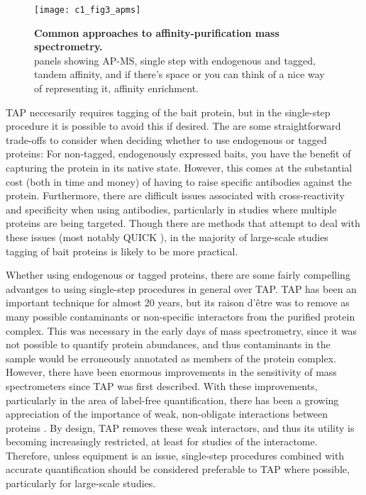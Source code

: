 \documentclass[a4paper,11pt,twoside,openright]{scrbook}
\begin{document}
\begin{figure}[h]
    \texttt{[image: c1\_fig3\_apms]}
    \caption[Common approaches to affinity-purification mass spectrometry]{\sffamily \textbf{Common approaches to affinity-purification mass spectrometry.} \\  panels showing AP-MS, single step with endogenous and tagged, tandem affinity, and if there's space or you can think of a nice way of representing it, affinity enrichment.}
    \label{c1fig3}
\end{figure}

TAP neccesarily requires tagging of the bait protein, but in the single-step procedure it is possible to avoid this if desired. The are some straightforward trade-offs to consider when deciding whether to use endogenous or tagged proteins: For non-tagged, endogenously expressed baits, you have the benefit of capturing the protein in its native state. However, this comes at the substantial cost (both in time and money) of having to raise specific antibodies against the protein. Furthermore, there are difficult issues associated with cross-reactivity and specificity when using antibodies, particularly in studies where multiple proteins are being targeted. Though there are methods that attempt to deal with these issues (most notably QUICK \cite{Selbach2006}), in the majority of large-scale studies tagging of bait proteins is likely to be more practical.

Whether using endogenous or tagged proteins, there are some fairly compelling advantges to using single-step procedures in general over TAP. TAP has been an important technique for almost 20 years, but its raison d'être was to remove as many possible contaminants or non-specific interactors from the purified protein complex. This was necessary in the early days of mass spectrometry, since it was not possible to quantify protein abundances, and thus contaminants in the sample would be erroneously annotated as members of the protein complex. However, there have been enormous improvements in the sensitivity of mass spectrometers since TAP was first described. With these improvements, particularly in the area of label-free quantification, there has been a growing appreciation of the importance of weak, non-obligate interactions between proteins \cite{Perkins2010a,Hein2015}. By design, TAP removes these weak interactors, and thus its utility is becoming increasingly restricted, at least for studies of the interactome. Therefore, unless equipment is an issue, single-step procedures combined with accurate quantification should be considered preferable to TAP where possible, particularly for large-scale studies.
\end{document}

